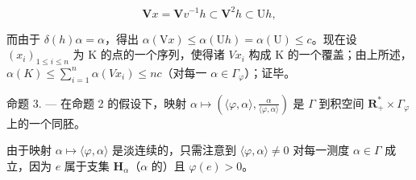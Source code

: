 \[
\mathbf {V} x = \mathbf {V} v ^ {- 1} h \subset \mathbf {V} ^ {2} h \subset \mathrm{U} h,
\]

而由于 \(\delta(h)\alpha = \alpha\)，得出 \(\alpha(\mathrm{V}x) \leqslant \alpha(\mathrm{U}h) = \alpha(\mathrm{U}) \leqslant c\)。现在设 \((x_i)_{1 \leqslant i \leqslant n}\) 为 K 的点的一个序列，使得诸 \(Vx_i\) 构成 K 的一个覆盖；由上所述，\(\alpha(K) \leqslant \sum_{i=1}^{n} \alpha(Vx_i) \leqslant nc\)（对每一 \(\alpha \in \Gamma_\varphi\)）；证毕。

命题 3. --- 在命题 2 的假设下，映射 \(\alpha \mapsto \left( \langle \varphi, \alpha \rangle, \frac{\alpha}{\langle \varphi, \alpha \rangle} \right)\) 是 \(\Gamma\) 到积空间 \(\mathbf{R}_{+}^{*} \times \Gamma_{\varphi}\) 上的一个同胚。

由于映射 \(\alpha \mapsto \langle \varphi, \alpha \rangle\) 是淡连续的，只需注意到 \(\langle \varphi, \alpha \rangle \neq 0\) 对每一测度 \(\alpha \in \Gamma\) 成立，因为 \(e\) 属于支集 \(\mathbf{H}_{\alpha}\)（\(\alpha\) 的）且 \(\varphi(e) > 0\)。

